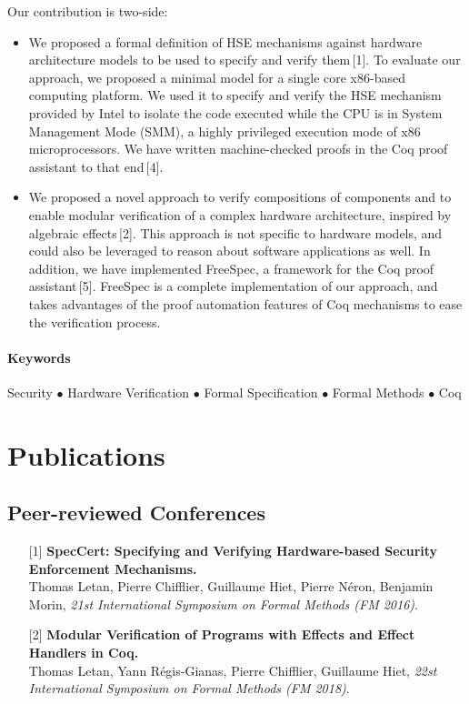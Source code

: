 \documentclass{article}
\begin{document}
Our contribution is two-side:
%
\begin{itemize}
\item We proposed a formal definition of HSE mechanisms against hardware
  architecture models to be used to specify and verify them\,[1].
  To evaluate our approach, we proposed a minimal model for a single core
  x86-based computing platform.
  We used it to specify and verify the HSE mechanism provided by Intel to
  isolate the code executed while the CPU is in System Management Mode (SMM), a
  highly privileged execution mode of x86 microprocessors.
  We have written machine-checked proofs in the Coq proof assistant to that
  end\,[4].
\item We proposed a novel approach to verify compositions of components and to
  enable modular verification of a complex hardware architecture, inspired by
  algebraic effects\,[2].
  This approach is not specific to hardware models, and could also be leveraged
  to reason about software applications as well.
  In addition, we have implemented FreeSpec, a framework for the Coq proof
  assistant\,[5].
  FreeSpec is a complete implementation of our approach, and takes advantages of
  the proof automation features of Coq mechanisms to ease the verification
  process.
\end{itemize}

\paragraph{Keywords}
%
Security $\bullet$ Hardware Verification $\bullet$ Formal Specification
$\bullet$ Formal Methods $\bullet$ Coq

\section{Publications}

\subsection{Peer-reviewed Conferences}

\begin{itemize}
\item[] [1] \textbf{SpecCert: Specifying and Verifying Hardware-based Security
    Enforcement
    Mechanisms.} \\
  Thomas Letan, Pierre Chifflier, Guillaume Hiet, Pierre Néron, Benjamin Morin,
  \emph{21st International Symposium on Formal Methods (FM 2016)}.
\item[] [2] \textbf{Modular Verification of Programs with Effects and Effect
    Handlers in Coq.} \\
  Thomas Letan, Yann Régis-Gianas, Pierre Chifflier, Guillaume Hiet, \emph{22st
    International Symposium on Formal Methods (FM 2018)}.
\end{itemize}
\end{document}
